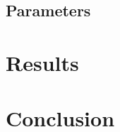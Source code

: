 \documentclass[12pt]{article}
\begin{document}
\subsection{Parameters} \label{parameters}
	

\section{Results} \label{results}
	

\section{Conclusion} \label{concluion}


\nocite{*}
\appendix %
\end{document}
